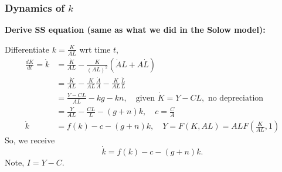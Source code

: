 \documentclass[12pt]{article}
\begin{document}
\begin{figure}[H]
\end{figure}








\subsubsection{Dynamics of $ k $}

{\textbf {Derive SS equation (same as what we did in the Solow model):}}

Differentiate $ k = \frac{K}{AL} $ wrt time $ t $,
\begin{align*}
\frac{dK}{dt} = \dot{k}&= \frac{\dot{K}}{AL} - \frac{K}{(AL)^{2}}(\dot{A}L + A \dot{L})
\\
&= \frac{\dot{K}}{AL} - \frac{K}{AL}\frac{\dot{A}}{A} - \frac{K}{AL}\frac{\dot{L}}{L}
\\
&= \frac{Y - CL}{AL} - kg  - kn, \quad \text{given } \dot{K} = Y - CL,\text{ no
depreciation}\\
&= \frac{Y}{AL} - \frac{CL}{L} - (g + n)k, \quad c = \frac{C}{A}\\
\dot{k}&= f(k) - c - (g + n)k, \quad Y = F(K,AL) = ALF(\frac{K}{AL},1)
\end{align*}
So, we receive
\begin{equation*}
\dot{k}= f(k) - c - (g + n)k.
\end{equation*}
Note, $ I = Y - C $. 
\end{document}
